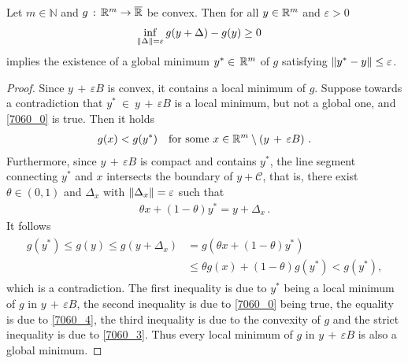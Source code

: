 \begin{lemma}
  \label{bw:cd:lem}
  Let $m\in\mathbb{N}$ and
  $g \,:\, \mathbb{R}^m \to \overline{\mathbb{R}}$ 
  be convex.
  Then 
  for all $y \in \mathbb{R}^m$ and $\varepsilon>0$ 
    \begin{gather}
      \label{7060_0}
      \inf_{\left\lVert\Delta\right\rVert=\varepsilon} g(y+\Delta) - g(y) \ge 0 \quad
    \end{gather}
    implies
    the existence of  
    a global minimum
    $
    y^* \in \,\mathbb{R}^m
    $
    of $g$
    satisfying
    $
      \left\lVert y^* - y\right\rVert \le \varepsilon
    $.
\end{lemma}
\begin{proof}
  Since 
  $
  y
  \,
  +
  \,
  \varepsilon
  B
  $
  is convex, it contains a 
  local minimum  
  of $g$.
  Suppose towards a contradiction that
  $
    y^* 
    \ 
    \in 
    \ 
  y
  \,
  +
  \,
  \varepsilon
  B
  $
  is a local minimum, but not a global one, and
  \eqref{7060_0} is true.
  Then it holds
  \begin{gather}
    \label{7060_3}
    g(x) < g(y^*)
    \quad
    \text{for some}\ 
    x 
    \in 
    \R^m 
    \setminus 
    \left( 
  y
  \,
  +
  \,
  \varepsilon
  B
    \right)
  \,.
  \end{gather}
  Furthermore, since 
  $
  y
  \,
  +
  \,
  \varepsilon
  B
  $ is compact and contains $y^*$,
  the line segment connecting 
  $y^*$ and $x$
  intersects the boundary of 
  $y + \mathcal{C}$, that is,
  there exist
  $
    \theta \in (0,1)
  $
  and 
  $
    \Delta_x
  $
  with 
  $
    \left\lVert\Delta_x\right\rVert=\varepsilon
  $
  such that
  \begin{gather}
    \label{7060_4}
    \theta x + (1 - \theta) y^* = y + \Delta_x
    \,.
  \end{gather}
    It follows
    \begin{align}
      \label{7060_5}
      \begin{split}
      g(y^*)
      \le
      g(y)
      \le
      g(y + \Delta_x)
      &=
      g(
        \theta x + (1 - \theta) y^*
      )
      \\
      &\le
      \theta g(x)
      + 
      (1 - \theta)
      g(y^*)
      <
      g(y^*)
      ,
      \end{split}
    \end{align}
    which is a contradiction.
    The first inequality is due to
    $y^*$ being a local minimum of $g$ in
    $
  y
  \,
  +
  \,
  \varepsilon
  B
    $,
    the second inequality is due to  
    \eqref{7060_0} being true,
    the equality is due to \eqref{7060_4},
    the third inequality is due to the convexity of $g$
    and the strict inequality is due to \eqref{7060_3}.
    Thus every local minimum of $g$ in
    $
  y
  \,
  +
  \,
  \varepsilon
  B
    $
    is also a global minimum.
\end{proof}

